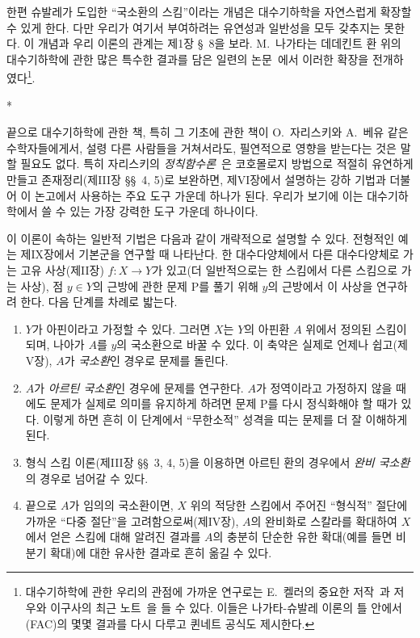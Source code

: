 한편 슈발레가 도입한 ``국소환의 스킴''이라는 개념은 대수기하학을 자연스럽게 확장할 수 있게 한다. 다만 우리가 여기서 부여하려는 유연성과 일반성을 모두 갖추지는 못한다. 이 개념과 우리 이론의 관계는 제1장 \S~8을 보라.
M.~나가타는 데데킨트 환 위의 대수기하학에 관한 많은 특수한 결과를 담은 일련의 논문~\cite{I-9}에서 이러한 확장을 전개하였다\footnote{대수기하학에 관한 우리의 관점에 가까운 연구로는 E.~켈러의 중요한 저작~\cite{I-22}과 저우와 이구사의 최근 노트~\cite{I-3}을 들 수 있다. 이들은 나가타-슈발레 이론의 틀 안에서 (FAC)의 몇몇 결과를 다시 다루고 퀸네트 공식도 제시한다.}.

\bigskip
\begin{center}*\quad*\quad*\end{center}
\bigskip

끝으로 대수기하학에 관한 책, 특히 그 기초에 관한 책이 O.~자리스키와 A.~베유 같은 수학자들에게서, 설령 다른 사람들을 거쳐서라도, 필연적으로 영향을 받는다는 것은 말할 필요도 없다.
특히 자리스키의 \emph{정칙함수론}~\cite{I-20}은 코호몰로지 방법으로 적절히 유연하게 만들고 존재정리(제III장 \S\S~4, 5)로 보완하면, 제VI장에서 설명하는 강하 기법과 더불어 이 논고에서 사용하는 주요 도구 가운데 하나가 된다. 우리가 보기에 이는 대수기하학에서 쓸 수 있는 가장 강력한 도구 가운데 하나이다.

이 이론이 속하는 일반적 기법은 다음과 같이 개략적으로 설명할 수 있다. 전형적인 예는 제IX장에서 기본군을 연구할 때 나타난다.
한 대수다양체에서 다른 대수다양체로 가는 고유 사상(제II장) $f:X\to Y$가 있고(더 일반적으로는 한 스킴에서 다른 스킴으로 가는 사상), 점 $y\in Y$의 근방에 관한 문제 P를 풀기 위해 $y$의 근방에서 이 사상을 연구하려 한다.
다음 단계를 차례로 밟는다.
\begin{enumerate}
  \item[$1^\circ$] $Y$가 아핀이라고 가정할 수 있다. 그러면 $X$는 $Y$의 아핀환 $A$ 위에서 정의된 스킴이 되며, 나아가 $A$를 $y$의 국소환으로 바꿀 수 있다.
  이 축약은 실제로 언제나 쉽고(제V장), $A$가 \emph{국소환}인 경우로 문제를 돌린다.
  \item[$2^\circ$] $A$가 \emph{아르틴 국소환}인 경우에 문제를 연구한다.
  $A$가 정역이라고 가정하지 않을 때에도 문제가 실제로 의미를 유지하게 하려면 문제 P를 다시 정식화해야 할 때가 있다. 이렇게 하면 흔히 이 단계에서 ``무한소적'' 성격을 띠는 문제를 더 잘 이해하게 된다.
  \item[$3^\circ$] 형식 스킴 이론(제III장 \S\S~3, 4, 5)을 이용하면 아르틴 환의 경우에서 \emph{완비 국소환}의 경우로 넘어갈 수 있다.
  \item[$4^\circ$] 끝으로 $A$가 임의의 국소환이면, $X$ 위의 적당한 스킴에서 주어진 ``형식적'' 절단에 가까운 ``다중 절단''을 고려함으로써(제IV장), $A$의 완비화로 스칼라를 확대하여 $X$에서 얻은 스킴에 대해 알려진 결과를 $A$의 충분히 단순한 유한 확대(예를 들면 비분기 확대)에 대한 유사한 결과로 흔히 옮길 수 있다.
\end{enumerate}

